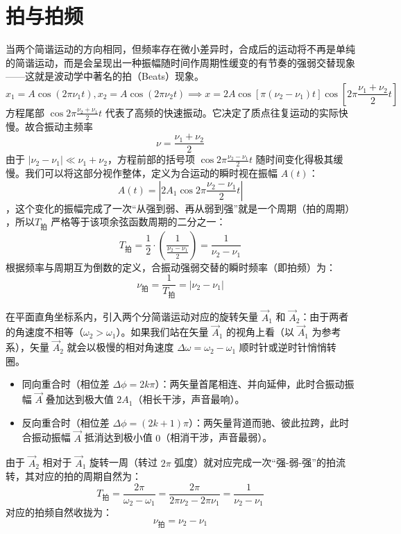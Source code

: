 

\section{拍与拍频}

\begin{definition}[拍与拍频]
当两个简谐运动的方向相同，但频率存在微小差异时，合成后的运动将不再是单纯的简谐运动，而是会呈现出一种振幅随时间作周期性缓变的有节奏的强弱交替现象——这就是波动学中著名的拍（Beats）现象。
\[x_1=A\cos(2\pi\nu_1 t),x_2=A\cos(2\pi\nu_2 t)\implies x=2A\cos\left[\pi(\nu_2-\nu_1)t\right]\cos\left[2\pi\frac{\nu_1+\nu_2}{2}t\right]\]
方程尾部 $\cos 2\pi \frac{\nu_2 + \nu_1}{2} t$ 代表了高频的快速振动。它决定了质点往复运动的实际快慢。故合振动主频率$$\nu = \frac{\nu_1 + \nu_2}{2}$$
由于 $|\nu_2 - \nu_1| \ll \nu_1 + \nu_2$，方程前部的括号项 $\cos 2\pi \frac{\nu_2 - \nu_1}{2} t$ 随时间变化得极其缓慢。我们可以将这部分视作整体，定义为合运动的瞬时视在振幅 $A(t)$：$$A(t) = \left| 2A_1 \cos 2\pi \frac{\nu_2 - \nu_1}{2} t \right|$$，这个变化的振幅完成了一次“从强到弱、再从弱到强”就是一个周期（拍的周期） ，所以$T_{\text{拍}}$ 严格等于该项余弦函数周期的二分之一：$$T_{\text{拍}} = \frac{1}{2} \cdot \left( \frac{1}{\frac{\nu_2 - \nu_1}{2}} \right) = \boxed{\frac{1}{\nu_2 - \nu_1}}$$根据频率与周期互为倒数的定义，合振动强弱交替的瞬时频率（即拍频）为：$$\nu_{\text{拍}} = \frac{1}{T_{\text{拍}}} = \boxed{|\nu_2 - \nu_1|}$$
\end{definition}

\begin{note}
在平面直角坐标系内，引入两个分简谐运动对应的旋转矢量 $\vec{A}_1$ 和 $\vec{A}_2$：由于两者的角速度不相等（$\omega_2 > \omega_1$）。如果我们站在矢量 $\vec{A}_1$ 的视角上看（以 $\vec{A}_1$ 为参考系），矢量 $\vec{A}_2$ 就会以极慢的相对角速度 $\Delta \omega = \omega_2 - \omega_1$ 顺时针或逆时针悄悄转圈。
\begin{itemize}
\item 同向重合时（相位差 $\Delta \phi = 2k\pi$）：两矢量首尾相连、并向延伸，此时合振动振幅 $\vec{A}$ 叠加达到极大值 $2A_1$（相长干涉，声音最响）。
\item 反向重合时（相位差 $\Delta \phi = (2k+1)\pi$）：两矢量背道而驰、彼此拉跨，此时合振动振幅 $\vec{A}$ 抵消达到极小值 $0$（相消干涉，声音最弱）。
\end{itemize}
由于 $\vec{A}_2$ 相对于 $\vec{A}_1$ 旋转一周（转过 $2\pi$ 弧度）就对应完成一次“强-弱-强”的拍流转，其对应的拍的周期自然为：$$T_{\text{拍}} = \frac{2\pi}{\omega_2 - \omega_1} = \frac{2\pi}{2\pi \nu_2 - 2\pi \nu_1} = \frac{1}{\nu_2 - \nu_1}$$对应的拍频自然收拢为：$$\nu_{\text{拍}} = \nu_2 - \nu_1$$
\end{note}

